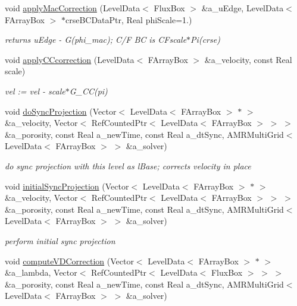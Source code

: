 \begin{DoxyCompactItemize}
\item 
void \hyperlink{class_c_c_projector_a3640ab686b29c975e57bf94e4577b6f9}{apply\-Mac\-Correction} (Level\-Data$<$ Flux\-Box $>$ \&a\-\_\-u\-Edge, Level\-Data$<$ F\-Array\-Box $>$ $\ast$crse\-B\-C\-Data\-Ptr, Real phi\-Scale=1.)
\begin{DoxyCompactList}\small\item\em returns u\-Edge -\/ G(phi\-\_\-mac); C/\-F B\-C is C\-Fscale$\ast$\-Pi(crse) \end{DoxyCompactList}\item 
void \hyperlink{class_c_c_projector_ae5f12569335d2a93b17e8f1ed9352452}{apply\-C\-Ccorrection} (Level\-Data$<$ F\-Array\-Box $>$ \&a\-\_\-velocity, const Real scale)
\begin{DoxyCompactList}\small\item\em vel \-:= vel -\/ scale$\ast$\-G\-\_\-\-C\-C(pi) \end{DoxyCompactList}\item 
\hypertarget{class_c_c_projector_a2238c15f0f7dc0da06cc299ca81d6bc7}{void \hyperlink{class_c_c_projector_a2238c15f0f7dc0da06cc299ca81d6bc7}{do\-Sync\-Projection} (Vector$<$ Level\-Data$<$ F\-Array\-Box $>$ $\ast$ $>$ \&a\-\_\-velocity, Vector$<$ Ref\-Counted\-Ptr$<$ Level\-Data$<$ F\-Array\-Box $>$ $>$ $>$ \&a\-\_\-porosity, const Real a\-\_\-new\-Time, const Real a\-\_\-dt\-Sync, A\-M\-R\-Multi\-Grid$<$ Level\-Data$<$ F\-Array\-Box $>$ $>$ \&a\-\_\-solver)}\label{class_c_c_projector_a2238c15f0f7dc0da06cc299ca81d6bc7}

\begin{DoxyCompactList}\small\item\em do sync projection with this level as l\-Base; corrects velocity in place \end{DoxyCompactList}\item 
\hypertarget{class_c_c_projector_a84f5a2f8d3e1f4bfc8892f2984ace095}{void \hyperlink{class_c_c_projector_a84f5a2f8d3e1f4bfc8892f2984ace095}{initial\-Sync\-Projection} (Vector$<$ Level\-Data$<$ F\-Array\-Box $>$ $\ast$ $>$ \&a\-\_\-velocity, Vector$<$ Ref\-Counted\-Ptr$<$ Level\-Data$<$ F\-Array\-Box $>$ $>$ $>$ \&a\-\_\-porosity, const Real a\-\_\-new\-Time, const Real a\-\_\-dt\-Sync, A\-M\-R\-Multi\-Grid$<$ Level\-Data$<$ F\-Array\-Box $>$ $>$ \&a\-\_\-solver)}\label{class_c_c_projector_a84f5a2f8d3e1f4bfc8892f2984ace095}

\begin{DoxyCompactList}\small\item\em perform initial sync projection \end{DoxyCompactList}\item 
\hypertarget{class_c_c_projector_acb7565b0f86279120a291d53cbf3a4a8}{void \hyperlink{class_c_c_projector_acb7565b0f86279120a291d53cbf3a4a8}{compute\-V\-D\-Correction} (Vector$<$ Level\-Data$<$ F\-Array\-Box $>$ $\ast$ $>$ \&a\-\_\-lambda, Vector$<$ Ref\-Counted\-Ptr$<$ Level\-Data$<$ Flux\-Box $>$ $>$ $>$ \&a\-\_\-porosity, const Real a\-\_\-new\-Time, const Real a\-\_\-dt\-Sync, A\-M\-R\-Multi\-Grid$<$ Level\-Data$<$ F\-Array\-Box $>$ $>$ \&a\-\_\-solver)}\label{class_c_c_projector_acb7565b0f86279120a291d53cbf3a4a8}


\end{DoxyCompactItemize}
